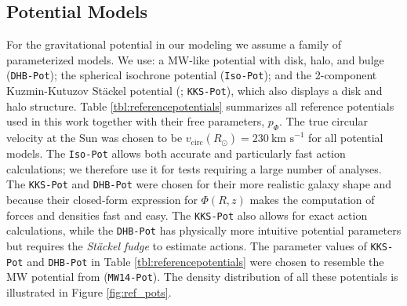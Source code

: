 \documentclass[iop,revtex4,numberedappendix,appendixfloats]{emulateapj}
\begin{document}
\newpage
\subsection{Potential Models} \label{sec:potentials}

For the gravitational potential in our modeling we assume a family of parameterized models. We use: a MW-like potential with disk, halo, and bulge (\texttt{DHB-Pot}); the spherical isochrone potential (\texttt{Iso-Pot}); and the 2-component Kuzmin-Kutuzov St\"{a}ckel potential (\citealt{1994AA...287...43B}; \texttt{KKS-Pot}), which also displays a disk and halo structure. Table \ref{tbl:referencepotentials} summarizes all reference potentials used in this work together with their free parameters, $p_\Phi$. The true circular velocity at the Sun was chosen to be $v_\text{circ}(R_\odot)=230~\text{km s}^{-1}$ for all potential models. The \texttt{Iso-Pot} allows both accurate and particularly fast action calculations; we therefore use it for tests requiring a large number of analyses. The \texttt{KKS-Pot} and \texttt{DHB-Pot} were chosen for their more realistic galaxy shape and because their closed-form expression for $\Phi(R,z)$ makes the computation of forces and densities fast and easy. The \texttt{KKS-Pot} also allows for exact action calculations, while the \texttt{DHB-Pot} has physically more intuitive potential parameters but requires the \emph{St\"{a}ckel fudge} to estimate actions. The parameter values of \texttt{KKS-Pot} and \texttt{DHB-Pot} in Table \ref{tbl:referencepotentials} were chosen to resemble the MW potential from \citet{2015ApJS..216...29B} (\texttt{MW14-Pot}). The density distribution of all these potentials is illustrated in Figure \ref{fig:ref_pots}. 

\end{document}
